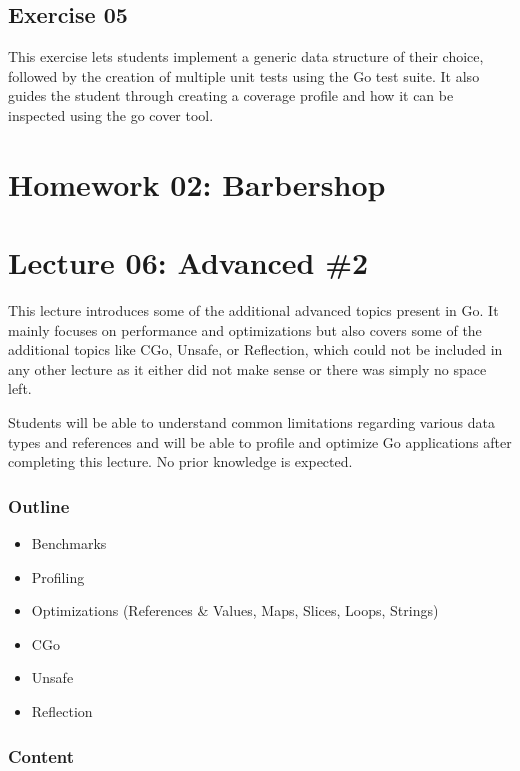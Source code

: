 \documentclass[
  digital,
  color,
  oneside,
  nosansbold,
  nocolorbold,
  nolof,
  nolot,
]{fithesis4}
\begin{document}
\subsection{Exercise 05}

This exercise lets students implement a generic data structure of their choice, followed by the creation of multiple unit tests using the Go test suite. It also guides the student through creating a coverage profile and how it can be inspected using the go cover tool.

\section{Homework 02: Barbershop}

\section{Lecture 06: Advanced \#2}

This lecture introduces some of the additional advanced topics present in Go. It mainly focuses on performance and optimizations but also covers some of the additional topics like CGo, Unsafe, or Reflection, which could not be included in any other lecture as it either did not make sense or there was simply no space left.

Students will be able to understand common limitations regarding various data types and references and will be able to profile and optimize Go applications after completing this lecture. No prior knowledge is expected.

\subsubsection{Outline}

\begin{itemize}
    \item Benchmarks
    \item Profiling
    \item Optimizations (References \& Values, Maps, Slices, Loops, Strings)
    \item CGo
    \item Unsafe
    \item Reflection
\end{itemize}

\subsubsection{Content}
\end{document}

